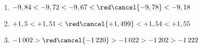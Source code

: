     \ \\ [-7mm]
    {\baselineskip=7mm
    \begin{enumerate}
       \item $-9,84 < -9,72 < -9,67 < {\red\cancel{-9,78}} < -9,18$
       \item $+1,5 < +1,51 < {\red\cancel{+1,499}} < +1,54 < +1,55$
       \item $-1\,002 > {\red\cancel{-1\,220}} > -1\,022 > -1\,202 > -1\,222$
    \end{enumerate}}
